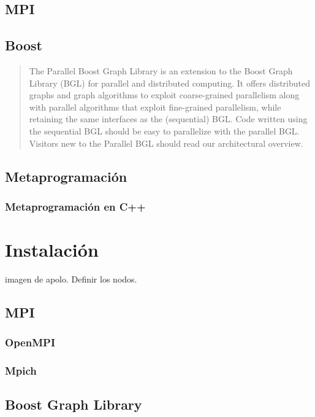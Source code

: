 \documentclass[twoside,letterpaper,12pt]{report}
\begin{document}
\section{MPI}
\section{Boost}

\begin{quotation}
The Parallel Boost Graph Library is an extension to the Boost Graph Library (BGL) for parallel and distributed computing. It offers distributed graphs and graph algorithms to exploit coarse-grained parallelism along with parallel algorithms that exploit fine-grained parallelism, while retaining the same interfaces as the (sequential) BGL. Code written using the sequential BGL should be easy to parallelize with the parallel BGL. Visitors new to the Parallel BGL should read our architectural overview.\cite{wwwboost} 
\end{quotation} 


\section{Metaprogramación}
\subsection{Metaprogramación en C++}


\chapter{Instalación}




imagen de apolo.
Definir los nodos.

\section{MPI}

\subsection{OpenMPI}
\subsection{Mpich}

\section{Boost Graph Library}
\end{document}
